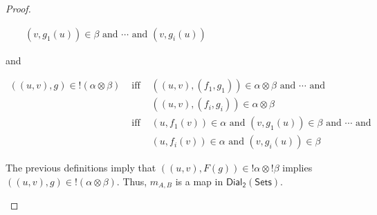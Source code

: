 \documentclass{elsarticle}
\newcommand{\dial}[0]{\mathsf{Dial_2}(\mathsf{Sets})}
\begin{document}
\begin{proof}
\begin{report}
\begin{center}
\begin{itemize}
\begin{center}
\begin{math}
\begin{array}{lll}
            &              & (v,g_1(u)) \in \beta \text{ and } \cdots \text{ and } (v,g_i(u)) 
          \end{array}
        \end{math}
      \end{center}
      and
      \begin{center}
        \begin{math}
          \begin{array}{lll}
            ((u,v),g) \in !(\alpha \otimes \beta) 
            & \text{ iff } & ((u,v),(f_1,g_1)) \in \alpha \otimes \beta \text{ and } \cdots \text{ and } \\
            &              & ((u,v),(f_i,g_i)) \in \alpha \otimes \beta\\
            & \text{ iff } & (u,f_1(v)) \in \alpha \text{ and } (v,g_1(u)) \in \beta \text{ and } \cdots \text{ and } \\
            &              & (u,f_i(v)) \in \alpha \text{ and } (v,g_i(u)) \in \beta
          \end{array}
        \end{math}
      \end{center}
      The previous definitions imply that
      $((u,v),F(g)) \in !\alpha \otimes !\beta$ implies
      $((u,v),g) \in !(\alpha \otimes \beta)$.  Thus, $m_{A,B}$ is a map in $\dial$.
      

\end{itemize}
\end{center}
\end{report}
\end{proof}
\end{document}

